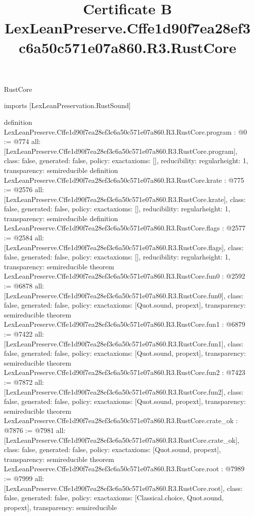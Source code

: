 \begin{lexlean}{RustCore}
\title{Certificate B LexLeanPreserve.Cffe1d90f7ea28ef3c6a50c571e07a860.R3.RustCore}
\begin{coremodule}
imports [LexLeanPreservation.RustSound]

definition LexLeanPreserve.Cffe1d90f7ea28ef3c6a50c571e07a860.R3.RustCore.program : @0 := @774 {
  all: [LexLeanPreserve.Cffe1d90f7ea28ef3c6a50c571e07a860.R3.RustCore.program],
  class: false,
  generated: false,
  policy: exact{axioms: []},
  reducibility: regular{height: 1},
  transparency: semireducible
}
definition LexLeanPreserve.Cffe1d90f7ea28ef3c6a50c571e07a860.R3.RustCore.krate : @775 := @2576 {
  all: [LexLeanPreserve.Cffe1d90f7ea28ef3c6a50c571e07a860.R3.RustCore.krate],
  class: false,
  generated: false,
  policy: exact{axioms: []},
  reducibility: regular{height: 1},
  transparency: semireducible
}
definition LexLeanPreserve.Cffe1d90f7ea28ef3c6a50c571e07a860.R3.RustCore.flags : @2577 := @2584 {
  all: [LexLeanPreserve.Cffe1d90f7ea28ef3c6a50c571e07a860.R3.RustCore.flags],
  class: false,
  generated: false,
  policy: exact{axioms: []},
  reducibility: regular{height: 1},
  transparency: semireducible
}
theorem LexLeanPreserve.Cffe1d90f7ea28ef3c6a50c571e07a860.R3.RustCore.fun0 : @2592 := @6878 {
  all: [LexLeanPreserve.Cffe1d90f7ea28ef3c6a50c571e07a860.R3.RustCore.fun0],
  class: false,
  generated: false,
  policy: exact{axioms: [Quot.sound, propext]},
  transparency: semireducible
}
theorem LexLeanPreserve.Cffe1d90f7ea28ef3c6a50c571e07a860.R3.RustCore.fun1 : @6879 := @7422 {
  all: [LexLeanPreserve.Cffe1d90f7ea28ef3c6a50c571e07a860.R3.RustCore.fun1],
  class: false,
  generated: false,
  policy: exact{axioms: [Quot.sound, propext]},
  transparency: semireducible
}
theorem LexLeanPreserve.Cffe1d90f7ea28ef3c6a50c571e07a860.R3.RustCore.fun2 : @7423 := @7872 {
  all: [LexLeanPreserve.Cffe1d90f7ea28ef3c6a50c571e07a860.R3.RustCore.fun2],
  class: false,
  generated: false,
  policy: exact{axioms: [Quot.sound, propext]},
  transparency: semireducible
}
theorem LexLeanPreserve.Cffe1d90f7ea28ef3c6a50c571e07a860.R3.RustCore.crate_ok : @7876 := @7981 {
  all: [LexLeanPreserve.Cffe1d90f7ea28ef3c6a50c571e07a860.R3.RustCore.crate_ok],
  class: false,
  generated: false,
  policy: exact{axioms: [Quot.sound, propext]},
  transparency: semireducible
}
theorem LexLeanPreserve.Cffe1d90f7ea28ef3c6a50c571e07a860.R3.RustCore.root : @7989 := @7999 {
  all: [LexLeanPreserve.Cffe1d90f7ea28ef3c6a50c571e07a860.R3.RustCore.root],
  class: false,
  generated: false,
  policy: exact{axioms: [Classical.choice, Quot.sound, propext]},
  transparency: semireducible
}


\end{coremodule}
\end{lexlean}
